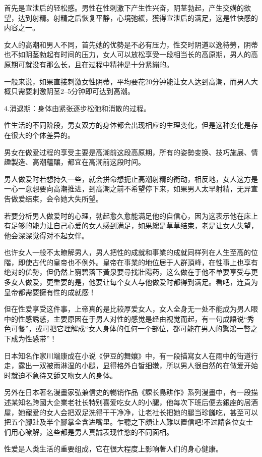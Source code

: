 \documentclass[12pt,UTF8]{ctexbook}
\begin{document}
首先是宣泄后的轻松感。男性在性刺激下产生性兴奋，阴茎勃起，产生交媾的欲望，达到射精。射精之后恢复平静，心境弛緩，獲得宣泄后的满足，这是性快感的内容之一。

女人的高潮和男人不同，首先她的优勢是不必有压力，性交时阴道以逸待勞，阴蒂也不如阴茎勃起有时间的压力，女人可以放松享受一段相当长的高原期，男人的高原期可就没有那么长，且在过程中精神是十分紧繃的。

一般来说，如果直接刺激女性阴蒂，平均要花20分钟能让女人达到高潮，而男人大概只需要刺激阴茎2--5分钟即可达到高潮。

4.消退期：身体由紧张逐步松弛和消散的过程。

性生活的不同阶段，男女双方的身体都会出现相应的生理变化，但是这种变化是存在很大的个体差异的。

男女在做爱过程的享受主要是高潮前这段高原期，所有的姿勢变换、技巧施展、情趣製造、高潮蘊釀，都宜在高潮前这段时间。

男人做爱时若想持久一些，就会拼命想扼止高潮射精的衝动，相反地，女人这方是一心一意想要向高潮推进，到高潮之前不希望停下来，如果男人太早射精，无异宣告做爱结束，会令她大失所望。

若要分析男人做爱时的心理，勃起愈久愈能满足他的自信心，因为这表示他在床上有足够的能力让自己心爱的女人感到满足，如果總是草草结束，老是让女人失望，他会深深觉得对不起女伴。

也许女人一般不太瞭解男人，男人把性的成就和事業的成就同样列在人生至高的位階，即使古代的皇帝也不例外。皇帝在事業的地位居于人群頂峰，在性事上也享有绝对的优勢，但仍然上窮碧落下黃泉要尋找壯陽药，这么做在于他不单要享受与更多女人做爱，更重要的是，他要让每个女人与他做爱时都得到满足。看吧，连貴为皇帝都需要擁有性的成就感！

但在性爱享受这件事，上帝真的是比较厚爱女人，女人全身无一处不能成为男人眼中的性感誘惑，主要原因在于男人对性的感觉是经由视觉而起，有一句成語说“秀色可餐”，或可把它理解成“女人身体的任何一个部位，都可能在男人的驚鴻一瞥之下成为性感带”！

日本知名作家川端康成在小说《伊豆的舞孃》中，有一段描寫女人在雨中的街道行走，露出一双被雨淋湿的小腿，显得格外白皙细嫩，所以男人很自然的在做爱开始时就迫不急待又舔又吻女人的身体。

另外在日本著名漫畫家弘兼信史的暢销作品《課长島耕作》系列漫畫中，有一段描述某知名跨國大企業老社长特别喜爱吃女人的小腿，他每次下班后便去銀座的居酒屋，她寵爱的女人会把双足洗得干干净净，让老社长把她的腿当珍饈吃，甚至可以把五个腳趾及半个腳掌全含进嘴里。乍聽之下頗让人難以置信吧!不过請各位女士们用心瞭解，这些都是男人真誠表现性慾的不同面相。

性爱是人类生活的重要组成，它在很大程度上影响著人们的身心健康。
\end{document}
